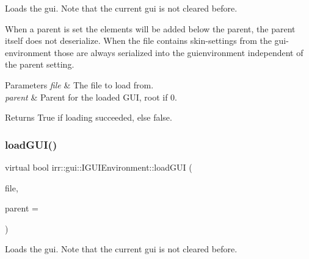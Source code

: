Loads the gui. Note that the current gui is not cleared before. 

When a parent is set the elements will be added below the parent, the parent itself does not deserialize. When the file contains skin-\/settings from the gui-\/environment those are always serialized into the guienvironment independent of the parent setting. 
\begin{DoxyParams}{Parameters}
{\em file} & The file to load from. \\
\hline
{\em parent} & Parent for the loaded G\+UI, root if 0. \\
\hline
\end{DoxyParams}
\begin{DoxyReturn}{Returns}
True if loading succeeded, else false. 
\end{DoxyReturn}
\mbox{\label{classirr_1_1gui_1_1IGUIEnvironment_a23e53c388d45358c53304d095f0b029b}} 
\subsubsection{\texorpdfstring{load\+G\+U\+I()}{loadGUI()}\hspace{0.1cm}{\footnotesize\ttfamily [4/4]}}
{\footnotesize\ttfamily virtual bool irr\+::gui\+::\+I\+G\+U\+I\+Environment\+::load\+G\+UI (\begin{DoxyParamCaption}\item[{\hyperlink{classirr_1_1io_1_1IReadFile}{io\+::\+I\+Read\+File} $\ast$}]{file,  }\item[{\hyperlink{classirr_1_1gui_1_1IGUIElement}{I\+G\+U\+I\+Element} $\ast$}]{parent = {} }\end{DoxyParamCaption})\hspace{0.3cm}{\ttfamily [pure virtual]}}



Loads the gui. Note that the current gui is not cleared before. 

